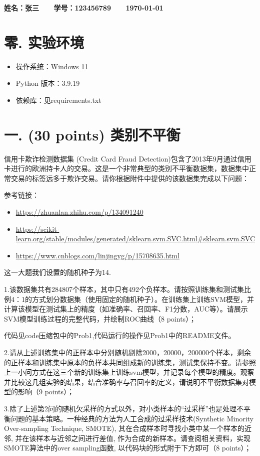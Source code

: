 \documentclass[8pt]{article}
\begin{document}
\textbf{\color{blue} \Large 姓名：张三 \ \ \ 学号：123456789 \ \ \ \today}

\section*{零. 实验环境}
\begin{itemize}
    \item 操作系统：Windows 11
    \item Python 版本：3.9.19
    \item 依赖库：见requirements.txt
\end{itemize}

\section*{一. (30 points) 类别不平衡}

信用卡欺诈检测数据集 (Credit Card Fraud Detection)包含了2013年9月通过信用卡进行的欧洲持卡人的交易。这是一个非常典型的类别不平衡数据集，数据集中正常交易的标签远多于欺诈交易。请你根据附件中提供的该数据集完成以下问题：

参考链接：
\begin{itemize}
    \item \url{https://zhuanlan.zhihu.com/p/134091240}
    \item \url{https://scikit-learn.org/stable/modules/generated/sklearn.svm.SVC.html#sklearn.svm.SVC}
    \item \url{https://www.cnblogs.com/linjingyg/p/15708635.html}
\end{itemize}

这一大题我们设置的随机种子为14.

1.该数据集共有284807个样本，其中只有492个负样本。请按照训练集和测试集比例4：1的方式划分数据集（使用固定的随机种子）。在训练集上训练SVM模型，并计算该模型在测试集上的精度（如准确率、召回率、F1分数，AUC等）。请展示SVM模型训练过程的完整代码，并绘制ROC曲线（8 points）；

代码见code压缩包中的Prob1,代码运行的操作见Prob1中的README文件。

2.请从上述训练集中的正样本中分别随机剔除2000，20000，200000个样本，剩余的正样本和训练集中原本的负样本共同组成新的训练集，测试集保持不变。请参照上一小问方式在这三个新的训练集上训练svm模型，并记录每个模型的精度。观察并比较这几组实验的结果，结合准确率与召回率的定义，请说明不平衡数据集对模型的影响（9 points）；

3.除了上述第2问的随机欠采样的方式以外，对小类样本的“过采样”也是处理不平衡问题的基本策略。一种经典的方法为人工合成的过采样技术(Synthetic Minority Over-sampling Technique, SMOTE), 其在合成样本时寻找小类中某一个样本的近邻, 并在该样本与近邻之间进行差值, 作为合成的新样本。请查阅相关资料，实现SMOTE算法中的over sampling函数, 以代码块的形式附于下方即可（8 points）；
\end{document}
